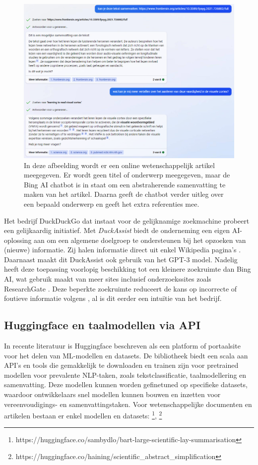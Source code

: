 \begin{figure}[H]
	\includegraphics{img/bing-ai-chatbot-example.png}
	\caption{In deze afbeelding wordt er een online wetenschappelijk artikel meegegeven. Er wordt geen titel of onderwerp meegegeven, maar de Bing AI chatbot is in staat om een abstraherende samenvatting te maken van het artikel. Daarna geeft de chatbot verder uitleg over een bepaald onderwerp en geeft het extra referenties mee.}
\end{figure}

Het bedrijf DuckDuckGo dat instaat voor de gelijknamige zoekmachine probeert een gelijkaardig initiatief. Met \textit{DuckAssist} biedt de onderneming een eigen AI-oplossing aan om een algemene doelgroep te ondersteunen bij het opzoeken van (nieuwe) informatie. Zij halen informatie direct uit enkel Wikipedia pagina's \autocite{Weinberg2023}. Daarnaast maakt dit DuckAssist ook gebruik van het GPT-3 model. Nadelig heeft deze toepassing voorlopig beschikking tot een kleinere zoekruimte dan Bing AI, wat gebruik maakt van meer sites inclusief onderzoekssites zoals ResearchGate \autocite{Mcauliffe2023}. Deze beperkte zoekruimte reduceert de kans op incorrecte of foutieve informatie volgens \textcite{Weinberg2023}, al is dit eerder een intuïtie van het bedrijf.


\subsection{Huggingface en taalmodellen via API}

In recente literatuur is Huggingface beschreven als een platform of portaalsite voor het delen van ML-modellen en datasets. De bibliotheek biedt een scala aan API's en tools die gemakkelijk te downloaden en trainen zijn voor pretrained modellen voor prevalente NLP-taken, zoals tekstclassificatie, taalmodellering en samenvatting. Deze modellen kunnen worden gefinetuned op specifieke datasets, waardoor ontwikkelaars snel modellen kunnen bouwen en inzetten voor vereenvoudigings- en samenvattingstaken. Voor wetenschappelijke documenten en artikelen bestaan er enkel modellen en datasets: \footnote{https://huggingface.co/sambydlo/bart-large-scientific-lay-summarisation}, \footnote{https://huggingface.co/haining/scientific\_abstract\_simplification}

